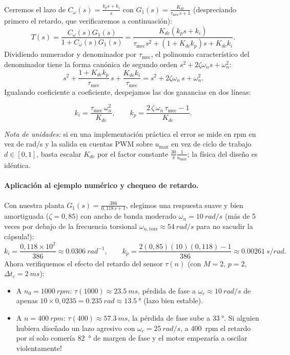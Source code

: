 \documentclass[11pt,a4paper,oneside]{book}
\begin{document}
Cerremos el lazo de $C_\omega(s) = \frac{k_p s + k_i}{s}$ con
$G_1(s) = \frac{K_{dc}}{\tau_{\text{mec}}s + 1}$ (despreciando primero el
retardo, que verificaremos a continuación):
\begin{equation}
  T(s) = \frac{C_\omega(s) G_1(s)}{1 + C_\omega(s) G_1(s)}
       = \frac{K_{dc}(k_p s + k_i)}{\tau_{\text{mec}} s^2 + (1 + K_{dc}k_p)s + K_{dc}k_i}.
  \label{eq:lazo_cerrado_pi}
\end{equation}
Dividiendo numerador y denominador por $\tau_{\text{mec}}$, el polinomio
característico del denominador tiene la forma canónica de segundo orden
$s^2 + 2\zeta\omega_n s + \omega_n^2$:
\[
  s^2 + \frac{1 + K_{dc}k_p}{\tau_{\text{mec}}}\,s + \frac{K_{dc}k_i}{\tau_{\text{mec}}}
  = s^2 + 2\zeta\omega_n\,s + \omega_n^2.
\]
Igualando coeficiente a coeficiente, despejamos las dos ganancias en dos líneas:
\begin{ecuacionclave}
\begin{equation}
  k_i = \frac{\tau_{\text{mec}}\,\omega_n^2}{K_{dc}},
  \qquad
  k_p = \frac{2\,\zeta\,\omega_n\,\tau_{\text{mec}} - 1}{K_{dc}}.
  \label{eq:sintonia_pi}
\end{equation}
\end{ecuacionclave}
\emph{Nota de unidades:} si en una implementación práctica el error se mide en
\si{rpm} en vez de \si{rad/s} y la salida en cuentas PWM sobre $u_{\max}$ en vez
de ciclo de trabajo $d\in[0,1]$, basta escalar $K_{dc}$ por el factor
constante $\frac{30}{\pi}\frac{1}{u_{\max}}$; la física del diseño es idéntica.

\paragraph{Aplicación al ejemplo numérico y chequeo de retardo.}
Con nuestra planta $G_1(s) = \frac{386}{0{,}118\,s + 1}$, elegimos una respuesta
suave y bien amortiguada ($\zeta = 0{,}85$) con ancho de banda moderado
$\omega_n = \SI{10}{rad/s}$ (más de 5 veces por debajo de la frecuencia
torsional $\omega_{n,\text{tors}} \approx \SI{54}{rad/s}$ para no sacudir la
cápsula!):
\[
  k_i = \frac{0{,}118\times 10^2}{386} \approx \SI{0,0306}{rad^{-1}},
  \qquad
  k_p = \frac{2(0{,}85)(10)(0{,}118) - 1}{386} \approx \SI{0,00261}{s/rad}.
\]
Ahora verifiquemos el efecto del retardo del sensor $\tau(n)$ (con $M=2$, $p=2$,
$\Delta t_c = \SI{2}{ms}$):
\begin{itemize}
  \item A $n_0 = \SI{1000}{rpm}$: $\tau(1000) \approx \SI{23,5}{ms}$, pérdida de
        fase a $\omega_c \approx \SI{10}{rad/s}$ de apenas
        $10\times 0{,}0235 = \SI{0,235}{rad} \approx \SI{13,5}{\degree}$
        (lazo bien estable).
  \item A $n = \SI{400}{rpm}$: $\tau(400) \approx \SI{57,3}{ms}$, la pérdida de
        fase sube a $\SI{33}{\degree}$. Si alguien hubiera diseñado un lazo
        agresivo con $\omega_c = \SI{25}{rad/s}$, a \SI{400}{rpm} el retardo por
        sí solo comería \SI{82}{\degree} de margen de fase y el motor empezaría
        a oscilar violentamente!
\end{itemize}
\end{document}
